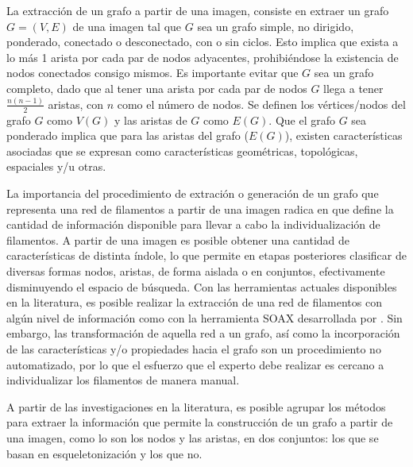 La extracci\'on de un grafo a partir de una imagen, consiste en extraer un grafo $G = (V,E)$ de una imagen tal que $G$ sea un grafo simple, no dirigido, ponderado, conectado o desconectado, con o sin ciclos. Esto implica que exista a lo m\'as 1 arista por cada par de nodos adyacentes, prohibi\'endose la existencia de nodos conectados consigo mismos. Es importante evitar que $G$ sea un grafo completo, dado que al tener una arista por cada par de nodos $G$ llega a tener $\frac{n(n-1)}{2}$ aristas, con $n$ como el n\'umero de nodos.
Se definen los v\'ertices/nodos del grafo $G$ como $V(G)$ y las aristas de $G$ como $E(G)$. 
Que el grafo $G$ sea ponderado implica que para las aristas del grafo ($E(G)$), existen caracter\'isticas asociadas que se expresan como caracter\'isticas geom\'etricas, topol\'ogicas, espaciales y/u otras.


La importancia del procedimiento de extraci\'on o generaci\'on de un grafo que representa una red de filamentos a partir de una imagen radica en que define la cantidad de informaci\'on disponible para llevar a cabo la individualizaci\'on de filamentos. A partir de una imagen es posible obtener una cantidad de caracter\'isticas de distinta \'indole, lo que permite en etapas posteriores clasificar de diversas formas nodos, aristas, de forma aislada o en conjuntos, efectivamente disminuyendo el espacio de b\'usqueda. Con las herramientas actuales disponibles en la literatura, es posible realizar la extracci\'on de una red de filamentos con algún nivel de informaci\'on como con la herramienta SOAX desarrollada por \citet{xu2015soax}. Sin embargo, las transformaci\'on de aquella red a un grafo, as\'i como la incorporaci\'on de las caracter\'isticas y/o propiedades hacia el grafo son un procedimiento no automatizado, por lo que el esfuerzo que el experto debe realizar es cercano a individualizar los filamentos de manera manual.

A partir de las investigaciones en la literatura, es posible agrupar los m\'etodos para extraer la informaci\'on que permite la construcci\'on de un grafo a partir de una imagen, como lo son los nodos y las aristas, en dos conjuntos: los que se basan en esqueletonizaci\'on  y los que no. 

